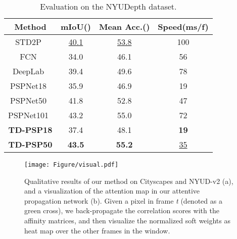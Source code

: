\documentclass[10pt,twocolumn,letterpaper]{article}
\begin{document}
\begin{table}
\centering
\small
\begin{tabular}{ |c|c|c|c|} 
 \hline
 \small{Method}      &\small{mIoU()} &\small{Mean Acc.()} &\small{Speed(ms/f)}\\ 
 \hline 
 \hline 
 \footnotesize{STD2P~\cite{he2017std2p} }          &\underline{40.1}    &\underline{53.8}               &100\\ 
 \hline 
 \footnotesize{FCN~\cite{long2015fully} }          &34.0                &46.1               &56\\ 
 \footnotesize{DeepLab~\cite{chen2017deeplab} }    &39.4                &49.6   &78\\ 
 \footnotesize{PSPNet18~\cite{zhao2017pyramid}}      &35.9              &46.9               &19\\ 
 \footnotesize{PSPNet50~\cite{zhao2017pyramid}}      &41.8              &52.8               &47\\
 \footnotesize{PSPNet101~\cite{zhao2017pyramid}}     &43.2              &55.0               &72\\
 \hline 
 \footnotesize{\textbf{TD-PSP18}}                &37.4              &48.1               &\textbf{19}\\ 
 \footnotesize{\textbf{TD-PSP50}}                &\textbf{43.5}     &\textbf{55.2}      &\underline{35}\\ 
 \hline
\end{tabular}
\vspace{0.1cm}
\caption{\small{Evaluation on the NYUDepth dataset.}}
\label{tab4}
\vspace{-0.2cm}
\end{table}

\begin{figure*}[t]
\centering
\texttt{[image: Figure/visual.pdf]}
\vspace{-0.3cm}
\caption{\small{ Qualitative results of our method on Cityscapes and NYUD-v2 (a), and a visualization of the attention map in our attentive propagation network (b). Given a pixel in frame \textit{t} (denoted as a green cross), we back-propagate the correlation scores with the affinity matrices, and then visualize the normalized soft weights as heat map over the other frames in the window.}
}
\label{fig5}
\vspace{-0.4cm}
\end{figure*}
\end{document}
